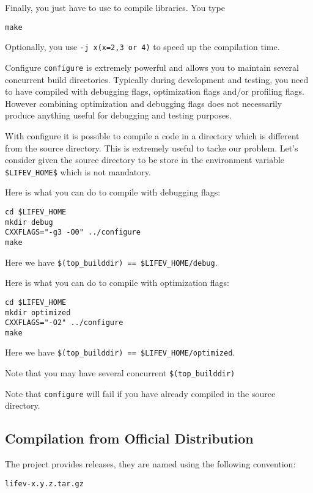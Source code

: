 \noindent Finally, you just have to use  to compile \lifev libraries. You type
\begin{verbatim}
make 
\end{verbatim}
Optionally, you use \verb!-j x(x=2,3 or 4)! to speed up the compilation time.

\begin{hint}{Configure}
  \label{hint:configure}
  \verb!configure! is extremely powerful and allows you to maintain
  several concurrent build directories. Typically during development
  and testing, you need to have \lifev compiled with debugging flags,
  optimization flags and/or profiling flags. However combining
  optimization and debugging flags does not necessarily produce
  anything useful for debugging and testing purposes.
  
  With configure it is possible to compile a code in a directory which
  is different from the source directory. This is extremely useful to
  tacke our problem. Let's consider given the source directory to be
  store in the environment variable \verb!$LIFEV_HOME$! which is not
  mandatory.

Here is what you can do to compile with debugging flags:
\begin{verbatim}
cd $LIFEV_HOME 
mkdir debug
CXXFLAGS="-g3 -O0" ../configure
make
\end{verbatim}
Here we have \verb+$(top_builddir) == $LIFEV_HOME/debug+.

Here is what you can do to compile with optimization flags:
\begin{verbatim}
cd $LIFEV_HOME
mkdir optimized
CXXFLAGS="-O2" ../configure
make
\end{verbatim}
Here we have \verb+$(top_builddir) == $LIFEV_HOME/optimized+.

\noindent Note that you may have several concurrent \verb+$(top_builddir)+

\noindent Note that \verb!configure! will fail if you have already compiled
\lifev in the source directory. 


\end{hint}


\subsection{Compilation from Official Distribution}
\label{sec:comp-from-offic}
The \lifev project provides releases, they are named using the following convention:
\begin{center}
\verb!lifev-x.y.z.tar.gz!
\end{center}

